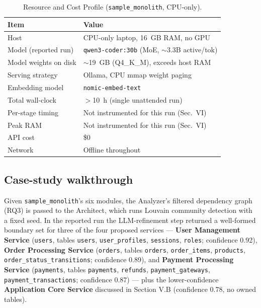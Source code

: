\documentclass[conference]{IEEEtran}
\begin{document}
\begin{table}[t]
\centering
\caption{Resource and Cost Profile (\texttt{sample\_monolith}, CPU-only).}
\label{tab:resources}
\begin{tabular}{@{}p{2.3cm}p{5.6cm}@{}}
\toprule
\textbf{Item} & \textbf{Value} \\
\midrule
Host & CPU-only laptop, 16~GB RAM, no GPU \\
Model (reported run) & \texttt{qwen3-coder:30b} (MoE, $\sim$3.3B active/tok) \\
Model weights on disk & $\sim$19~GB (Q4\_K\_M), exceeds host RAM \\
Serving strategy & Ollama, CPU mmap weight paging \\
Embedding model & \texttt{nomic-embed-text} \\
Total wall-clock & $>$10~h (single unattended run) \\
Per-stage timing & Not instrumented for this run (Sec.~VI) \\
Peak RAM & Not instrumented for this run (Sec.~VI) \\
API cost & \$0 \\
Network & Offline throughout \\
\bottomrule
\end{tabular}
\end{table}

\subsection{Case-study walkthrough}

Given \texttt{sample\_monolith}'s six modules, the Analyzer's filtered dependency graph (RQ3) is passed to the Architect, which runs Louvain community detection with a fixed seed. In the reported run the LLM-refinement step returned a well-formed boundary set for three of the four proposed services --- \textbf{User Management Service} (\texttt{users}, tables \texttt{users}, \texttt{user\_profiles}, \texttt{sessions}, \texttt{roles}; confidence 0.92), \textbf{Order Processing Service} (\texttt{orders}, tables \texttt{orders}, \texttt{order\_items}, \texttt{products}, \texttt{order\_status\_transitions}; confidence 0.89), and \textbf{Payment Processing Service} (\texttt{payments}, tables \texttt{payments}, \texttt{refunds}, \texttt{payment\_gateways}, \texttt{payment\_transactions}; confidence 0.87) --- plus the lower-confidence \textbf{Application Core Service} discussed in Section V.B (confidence 0.78, no owned tables).
\end{document}

